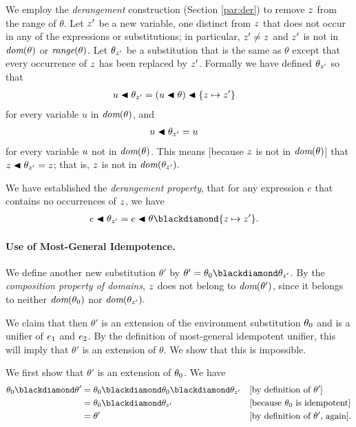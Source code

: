 \documentclass[runningheads]{llncs}
\begin{document}
We employ the \emph{derangement} construction (Section \ref{par:der}) to remove $z$ from the range of $\theta$. Let $z'$ be a new variable, one distinct from $z$ that does not occur in any of the expressions or substitutions; in particular, $z' \neq z$ and $z'$ is not in $\emph{dom}(\theta)$ or $\emph{range}(\theta)$. Let $\theta_{z'}$ be a substitution that is the same as $\theta$ except that every occurrence of $z$ has been replaced by $z'$.  Formally we have defined $\theta_{z'}$ so that
\begin{align*}
  & u \blacktriangleleft \theta_{z'} = (u \blacktriangleleft \theta) \blacktriangleleft \{z \mapsto z'\}
 \end{align*}
 for every variable $u$ in $\emph{dom}(\theta)$, and
 \begin{align*}
  & u \blacktriangleleft \theta_{z'} = u  
 \end{align*}
 for every variable $u$ not in $\emph{dom}(\theta)$. 
 This means [because $z$ is not in $\emph{dom}(\theta)$] that $z \blacktriangleleft \theta_{z'} = z$; that is, $z$ is not in $\emph{dom}(\theta_{z'}).$ 
 
We have established the \emph{derangement property}, that for any expression $e$ that contains no occurrences of $z$, we have
 \begin{align*}
  & e \apply \thet{z'} = e \apply \theta \compose \{\var{z} \mapsto \var{z'}\}.
 \end{align*}

\paragraph{Use of Most-General Idempotence.} We define another new substitution $\theta'$ by $\theta' = \thet{0} \compose \thet{z'}$.  By the \emph{composition property of domains}, $z$ does not belong to $\emph{dom}(\theta')$, since it belongs to neither $\emph{dom}(\theta_{0})$ nor  $\emph{dom}(\theta_{z'}).$ 

We claim that then $\theta'$ is an extension of the environment substitution  $\theta_{0}$ and is a unifier of  $e_{1}$ and $e_{2}$.
By the definition of most-general idempotent unifier, this will imply that $\theta'$ is an extension of $\theta.$  We show that this is impossible.

 We first show that $\theta'$ is an extension of $\theta_{0}$. 
 We have 
\begin{align*}
 \thet{0} \compose \theta' &= \thet{0} \compose \thet{0} \compose \thet{z'}  &&  
  \text{[by definition of $\theta'$]} \\
    &= \thet{0} \compose \thet{z'} && 
    \text{[because $\thet{0}$ is idempotent]} \\
    &= \theta' &&
    \text{[by definition of $\theta'$, again]}.
 \end{align*} 
 
\end{document}
